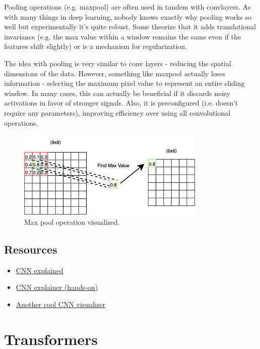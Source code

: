 \documentclass[12pt]{article}
\begin{document}
Pooling operations (e.g. maxpool) are often used in tandem with convlayers. As with many things in deep learning, nobody knows exactly why pooling works so well but experimentally it's quite robust. Some theorize that it adds translational invariance (e.g. the max value within a window remains the same even if the features shift slightly) or is a mechanism for regularization.

The idea with pooling is very similar to conv layers - reducing the spatial dimensions of the data. However, something like maxpool actually loses information - selecting the maximum pixel value to represent an entire sliding window. In many cases, this can actually be beneficial if it discards noisy activations in favor of stronger signals. Also, it is preconfigured (i.e. doesn't require any parameters), improving efficiency over using all convolutional operations.
\begin{figure}[H]
    \centering
    \includegraphics[width=0.8\textwidth]{../media/pooling.png}
    \caption{Max pool operation visualized. }
    \label{fig:pooling}
\end{figure}

\subsection{Resources}
\begin{itemize}
  \item \href{https://towardsdatascience.com/convolutional-neural-networks-explained-9cc5188c4939/}{CNN explained}  
  \item \href{https://poloclub.github.io/cnn-explainer/}{CNN explainer (hands-on)}
  \item \href{https://adamharley.com/nn_vis/cnn/3d.html}{Another cool CNN visualizer}
\end{itemize}

\newpage
\section{Transformers}
\end{document}
